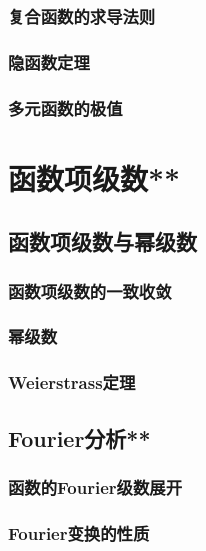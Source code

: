 \subsection{复合函数的求导法则}
\clearpage
\subsection{隐函数定理}
\clearpage
\subsection{多元函数的极值}
\clearpage


\chapter{函数项级数**}
\section{函数项级数与幂级数}
\subsection{函数项级数的一致收敛}
\clearpage
\subsection{幂级数}
\clearpage
\subsection{Weierstrass定理}
\clearpage

\section{Fourier分析**}
\subsection{函数的Fourier级数展开}
\clearpage
\subsection{Fourier变换的性质}
\clearpage